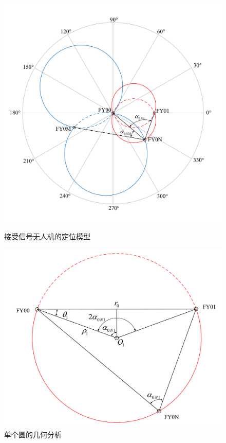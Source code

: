 \documentclass[12pt,AutoFakeSlant,AutoFakeBold]{article}
\begin{document}
\begin{figure}[!ht]
    \centering
    \begin{minipage}[t]{0.48\textwidth}
        \centering
        \includegraphics[width=\textwidth]{图片/问题1-1示意图.pdf}
        \caption{接受信号无人机的定位模型}
        \label{fig:问题1-1示意图}
    \end{minipage}
    \begin{minipage}[t]{0.48\textwidth}
        \centering
        \includegraphics[width=\textwidth]{图片/问题1-1示意图 - 局部.pdf}
        \caption{单个圆的几何分析}
        \label{fig:单个圆的几何分析}
    \end{minipage}
\end{figure}
\end{document}

